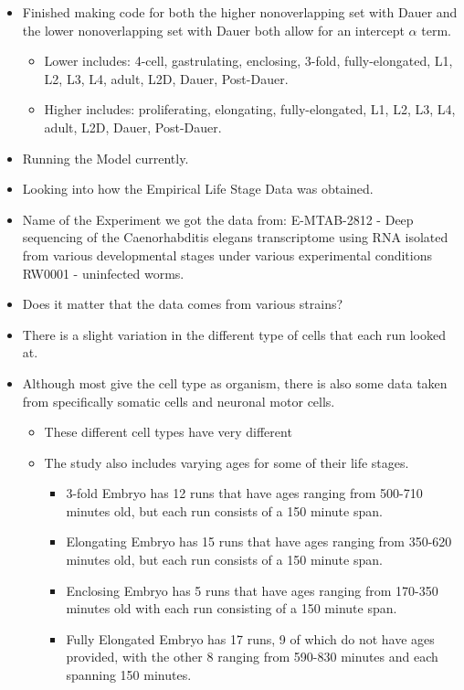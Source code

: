 \documentclass[letterpaper,index=totoc,hyperref,openany]{labbook} %
\begin{document}
\begin{itemize}
\item Finished making code for both the higher nonoverlapping set with Dauer and the lower nonoverlapping set with Dauer both allow for an intercept $ \alpha$ term.
\begin{itemize}
\item Lower includes: 4-cell, gastrulating, enclosing, 3-fold, fully-elongated, L1, L2, L3, L4, adult, L2D, Dauer, Post-Dauer.
\item Higher includes: proliferating, elongating, fully-elongated, L1, L2, L3, L4, adult, L2D, Dauer, Post-Dauer.
\end{itemize}
\item Running the Model currently.
\item Looking into how the Empirical Life Stage Data was obtained.
\item Name of the Experiment we got the data from: E-MTAB-2812 - Deep sequencing of the Caenorhabditis elegans transcriptome using RNA isolated from various developmental stages under various experimental conditions RW0001 - uninfected worms.
\item Does it matter that the data comes from various strains?
\item There is a slight variation in the different type of cells that each run looked at.
\item Although most give the cell type as organism, there is also some data taken from specifically somatic cells and neuronal motor cells.
\begin{itemize}
\item These different cell types have very different 
\item The study also includes varying ages for some of their life stages.
\begin{itemize}
\item 3-fold Embryo has 12 runs that have ages ranging from 500-710 minutes old, but each run consists of a 150 minute span.
\item Elongating Embryo has 15 runs that have ages ranging from 350-620 minutes old, but each run consists of a 150 minute span.
\item Enclosing Embryo has 5 runs that have ages ranging from 170-350 minutes old with each run consisting of a 150 minute span.
\item Fully Elongated Embryo has 17 runs, 9 of which do not have ages provided, with the other 8 ranging from 590-830 minutes and each spanning 150 minutes.

\end{itemize}
\end{itemize}
\end{itemize}
\end{document}
